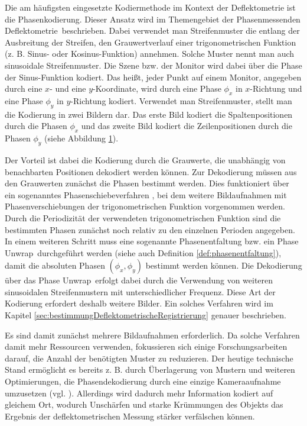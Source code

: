 Die am häufigsten eingesetzte Kodiermethode im Kontext der Deflektometrie ist die Phasenkodierung.
Dieser Ansatz wird im Themengebiet der \glqq Phasenmessenden Deflektometrie\grqq ~beschrieben.
Dabei verwendet man Streifenmuster die entlang der Ausbreitung der Streifen, den Grauwertverlauf einer trigonometrischen Funktion (z. B. Sinus- oder Kosinus-Funktion) annehmen.
Solche Muster nennt man auch sinusoidale Streifenmuster.
Die Szene bzw. der Monitor wird dabei über die Phase der Sinus-Funktion kodiert.
Das heißt, jeder Punkt auf einem Monitor, angegeben durch eine $x$- und eine $y$-Koordinate, wird durch eine Phase $\phi_x$ in $x$-Richtung und eine Phase $\phi_y$ in $y$-Richtung kodiert.
Verwendet man Streifenmuster, stellt man die Kodierung in zwei Bildern dar.
Das erste Bild kodiert die Spaltenpositionen durch die Phasen $\phi_x$ und das zweite Bild kodiert die Zeilenpositionen durch die Phasen $\phi_y$ (siehe Abbildung \ref{tikz:abbSinusoidaleStreifenmuster}).

\begin{figure}[H]
	\centering
		
		\label{tikz:abbSinusoidaleStreifenmuster}
\end{figure}

\noindent
Der Vorteil ist dabei die Kodierung durch die Grauwerte, die unabhängig von benachbarten Positionen dekodiert werden können.
Zur Dekodierung müssen aus den Grauwerten zunächst die Phasen bestimmt werden.
Dies funktioniert über ein sogenanntes Phasenschiebeverfahren \cite{carre}, bei dem weitere Bildaufnahmen mit Phasenverschiebungen der trigonometrischen Funktion vorgenommen werden.
Durch die Periodizität der verwendeten trigonometrischen Funktion sind die bestimmten Phasen zunächst noch relativ zu den einzelnen Perioden angegeben.
In einem weiteren Schritt muss eine sogenannte Phasenentfaltung bzw. ein \glqq Phase Unwrap\grqq ~durchgeführt werden (siehe auch Definition \ref{def:phasenentfaltung}), damit die absoluten Phasen $\left(\phi_x,\phi_y\right)$ bestimmt werden können.
Die Dekodierung über das \glqq Phase Unwrap\grqq ~erfolgt dabei durch die Verwendung von weiteren sinusoidalen Streifenmustern mit unterschiedlicher Frequenz.
Diese Art der Kodierung erfordert deshalb weitere Bilder.
Ein solches Verfahren wird im Kapitel \ref{sec:bestimmungDeflektometrischeRegistrierung} genauer beschrieben.

\p
Es sind damit zunächst mehrere Bildaufnahmen erforderlich.
Da solche Verfahren damit mehr Ressourcen verwenden, fokussieren sich einige Forschungsarbeiten darauf, die Anzahl der benötigten Muster zu reduzieren.
Der heutige technische Stand ermöglicht es bereits z. B. durch Überlagerung von Mustern und weiteren Optimierungen, die Phasendekodierung durch eine einzige Kameraaufnahme umzusetzen (vgl. \cite{waveletPMD}).
Allerdings wird dadurch mehr Information kodiert auf gleichem Ort, wodurch Unschärfen und starke Krümmungen des Objekts das Ergebnis der deflektometrischen Messung stärker verfälschen können.